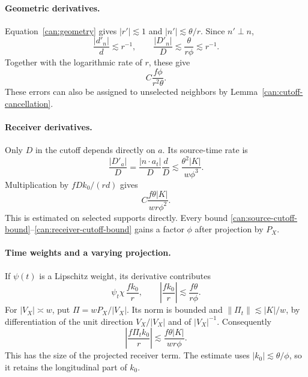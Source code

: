 \paragraph{Geometric derivatives.}
Equation~\eqref{can:geometry} gives $|r'|\lesssim1$ and
$|n'|\lesssim\theta/r$. Since $n'\perp n$,
\[
 \frac{|d'_n|}{d}\lesssim r^{-1},\qquad
 \frac{|D'_n|}{D}\lesssim\frac{\theta}{r\phi}\lesssim r^{-1}.
\]
Together with the logarithmic rate of $r$, these give
\begin{equation}\label{can:spatial-cutoff-bound}
 C\frac{f\phi}{r^2\theta}.
\end{equation}
These errors can also be assigned to unselected neighbors by
Lemma~\ref{can:cutoff-cancellation}.

\paragraph{Receiver derivatives.}
Only $D$ in the cutoff depends directly on $a$. Its source-time rate is
\[
 \frac{|D'_a|}{D}
   =\frac{|n\cdot a_t|}{D}\frac dD
   \lesssim\frac{\theta^2|K|}{w\phi^3}.
\]
Multiplication by $fDk_0/(rd)$ gives
\begin{equation}\label{can:receiver-cutoff-bound}
 C\frac{f\theta|K|}{wr\phi^2}.
\end{equation}
This is estimated on selected supports directly. Every bound
\eqref{can:source-cutoff-bound}--\eqref{can:receiver-cutoff-bound} gains
a factor $\phi$ after projection by $P_X$.

\paragraph{Time weights and a varying projection.}
If $\psi(t)$ is a Lipschitz weight, its derivative contributes
\begin{equation}\label{can:time-weight-bound}
 \psi_t\chi\,\frac{fk_0}{r},
 \qquad\left|\frac{fk_0}{r}\right|\lesssim\frac{f\theta}{r\phi}.
\end{equation}
For $|V_X|\asymp w$, put $\Pi=wP_X/|V_X|$. Its norm is bounded and
$\|\Pi_t\|\lesssim |K|/w$, by differentiation of the unit direction
$V_X/|V_X|$ and of $|V_X|^{-1}$. Consequently
\begin{equation}\label{can:projector-derivative}
 \left|\frac{f\Pi_tk_0}{r}\right|
       \lesssim\frac{f\theta|K|}{wr\phi}.
\end{equation}
This has the size of the projected receiver term. The estimate uses
$|k_0|\lesssim\theta/\phi$, so it retains the longitudinal part of $k_0$.

